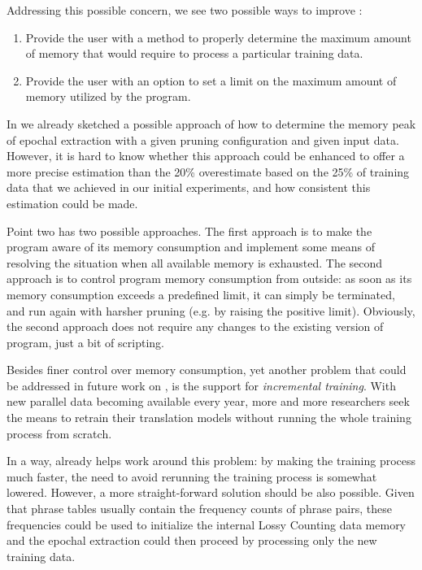 Addressing this possible concern, we see two possible ways to improve \eppex{}:
\begin{enumerate}
  \item Provide the user with a method to properly determine the maximum amount
    of memory that \eppex{} would require to process a particular training data.
  \item Provide the user with an option to set a limit on the maximum amount
    of memory utilized by the program.
\end{enumerate}

In  we already sketched a possible approach of how to determine
the memory peak of epochal extraction with a given pruning configuration and given input data.
However, it is hard to know whether this approach could be enhanced to offer
a more precise estimation than the 20\% overestimate based on the 25\% of training
data that we achieved in our initial experiments, and how consistent this estimation
could be made.

Point two has two possible approaches.
The first approach is to make the program aware of its memory consumption and implement
some means of resolving the situation when all available memory is exhausted.
The second approach is to control program memory consumption from outside:
as soon as its memory consumption exceeds a predefined limit, it can simply be terminated, 
and run again with harsher pruning (e.g. by raising the positive limit).
Obviously, the second approach does not require any changes to the existing version of
program, just a bit of scripting.

Besides finer control over memory consumption, yet another problem that could
be addressed in future work on \eppex{}, is the support for \emph{incremental
training}.
With new parallel data becoming available every year, more and more researchers seek
the means to retrain their translation models without running the whole
training process from scratch.

In a way, \eppex{} already helps work around this problem: by making the training
process much faster, the need to avoid rerunning the training process is somewhat
lowered.
However, a more straight-forward solution should be also possible.
Given that phrase tables usually contain the frequency counts of phrase pairs,
these frequencies could be used to initialize the internal Lossy Counting data
memory and the epochal extraction could then proceed by processing only the new
training data.

